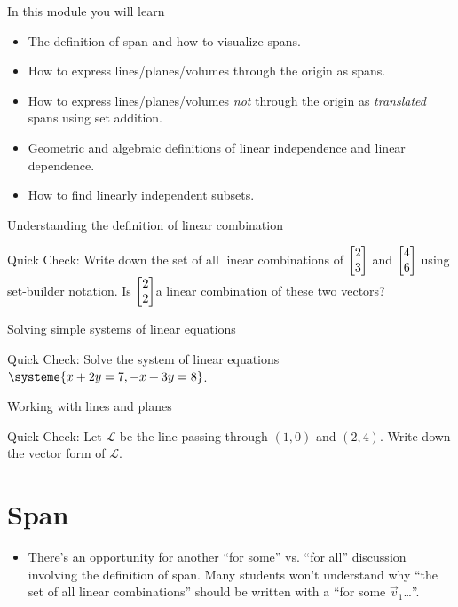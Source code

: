 \begin{module}

	In this module you will learn
	\begin{itemize}
		\item The definition of span and how to visualize spans.
		\item How to express lines/planes/volumes through the origin as spans.
		\item How to express lines/planes/volumes \emph{not} through the origin as
			\emph{translated} spans using set addition.
		\item Geometric and algebraic definitions of linear independence and linear
			dependence.
		\item How to find linearly independent subsets.
	\end{itemize}

	\begin{beforeyouread}
		\item Understanding the definition of linear combination

		\item[] Quick Check: Write down the set of all linear combinations of
			$\mat{2 \\ 3}$ and $\mat{4 \\ 6}$ using set-builder notation. Is $\mat{2 \\ 2}$a
			linear combination of these two vectors?

		\item Solving simple systems of linear equations

		\item[] Quick Check: Solve the system of linear equations
			$\systeme{x+2y=7, -x+3y=8}$.

		\item Working with lines and planes

		\item[] Quick Check: Let $\mathcal{L}$ be the line passing through $(1,0)$ and $(2,4)$.
			Write down the vector form of $\mathcal{L}$.
	\end{beforeyouread}

	
	
\end{module}


	\bookonlynewpage
\section*{Span}
	\begin{annotation}
		\begin{notes}
			\begin{itemize}
				\item There's an opportunity for another ``for some'' vs. ``for all''
					discussion involving the definition of span. Many students won't
					understand why ``the set of all linear combinations'' should
					be written with a ``for some $\vec v_1$\ldots''.
			\end{itemize}
		\end{notes}
	\end{annotation}

